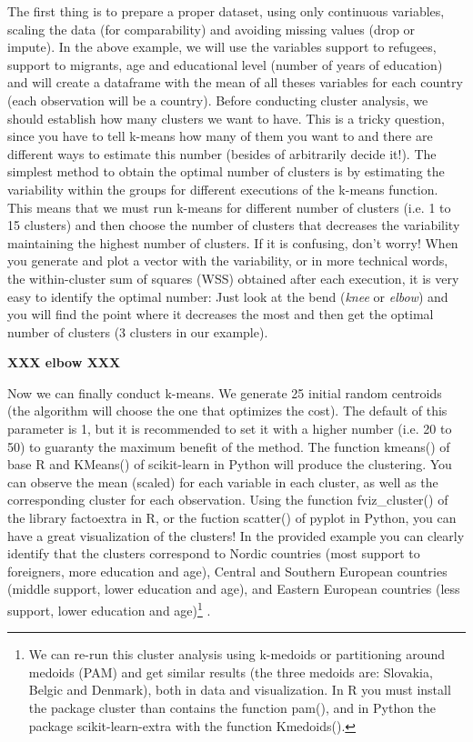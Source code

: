 The first thing is to prepare a proper dataset, using only continuous variables, scaling the data (for comparability) and avoiding missing values (drop or impute). In the above example, we will use the variables support to refugees, support to migrants, age and educational level (number of years of education) and will create a dataframe with the mean of all theses variables for each country (each observation will be a country). Before conducting cluster analysis, we should establish how many clusters we want to have. This is a tricky question, since you have to tell k-means how many of them you want to and there are different ways to estimate this number (besides of arbitrarily decide it!). The simplest method to obtain the optimal number of clusters is by estimating the variability within the groups for different executions of the k-means function. This means that we must run k-means for different number of clusters (i.e. 1 to 15 clusters) and then choose the number of clusters that decreases the variability maintaining the highest number of clusters. If it is confusing, don’t worry!  When you generate and plot a vector with the variability, or in more technical words, the within-cluster sum of squares (WSS) obtained after each execution, it is very easy to identify the optimal number: Just look at the bend (\textit{knee} or \textit{elbow}) and you will find the point where it decreases the most and then get the optimal number of clusters (3 clusters in our example).

\textbf{XXX  elbow  XXX}

Now we can finally conduct k-means. We generate 25 initial random centroids (the algorithm will choose the one that optimizes the cost). The default of this parameter is 1, but it is recommended to set it with a higher number (i.e. 20 to 50) to guaranty the maximum benefit of the method. The function kmeans() of base R and KMeans() of scikit-learn in Python will produce the clustering. You can observe the mean (scaled) for each variable in each cluster, as well as the corresponding cluster for each observation. Using the function fviz\_cluster() of the library factoextra in R, or the fuction scatter() of pyplot  in Python, you can have a great visualization of the clusters! In the provided example you can clearly identify that the clusters correspond to Nordic countries (most support to foreigners, more education and age), Central and Southern European countries (middle support, lower education and age), and Eastern European countries (less support, lower education and age)\footnote{We can re-run this cluster analysis using k-medoids or partitioning around medoids (PAM) and get similar results (the three medoids are: Slovakia, Belgic and Denmark), both in data and visualization. In R you must install the package cluster than contains the function pam(), and in Python the package scikit-learn-extra with the function Kmedoids().} .

